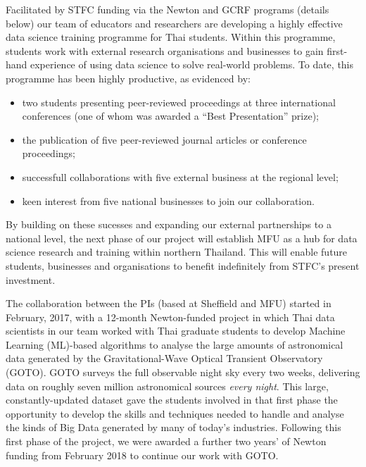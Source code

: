 \documentclass[11pt]{article}
\begin{document}
  Facilitated by STFC funding via the Newton and GCRF programs (details below) our team of educators and researchers are developing a highly effective data science training programme for Thai students. Within this programme, students work with external research organisations and businesses to gain first-hand experience of using data science to solve real-world problems. To date, this programme has been highly productive, as evidenced by:
  \begin{itemize}
    \item two students presenting peer-reviewed proceedings at three international conferences (one of whom was awarded a ``Best Presentation'' prize);
    \item the publication of five peer-reviewed journal articles or conference proceedings;
    \item successfull collaborations with five external business at the regional level;
    \item keen interest from five national businesses to join our collaboration.
  \end{itemize}
  By building on these sucesses and expanding our external partnerships to a national level, the next phase of our project will establish MFU as a hub for data science research and training within northern Thailand. This will enable future students, businesses and organisations to benefit indefinitely from STFC's present investment.
  
  The collaboration between the PIs (based at Sheffield and MFU) started in February, 2017, with a 12-month Newton-funded project in which Thai data scientists in our team worked with Thai graduate students to develop Machine Learning (ML)-based algorithms to analyse the large amounts of astronomical data generated by the Gravitational-Wave Optical Transient Observatory (GOTO). GOTO surveys the full observable night sky every two weeks, delivering data on roughly seven million astronomical sources {\it every night}. This large, constantly-updated dataset gave the students involved in that first phase the opportunity to develop the skills and techniques needed to handle and analyse the kinds of Big Data generated by many of today's industries. Following this first phase of the project, we were awarded a further two years' of Newton funding from February 2018 to continue our work with GOTO. 
  
\end{document}
